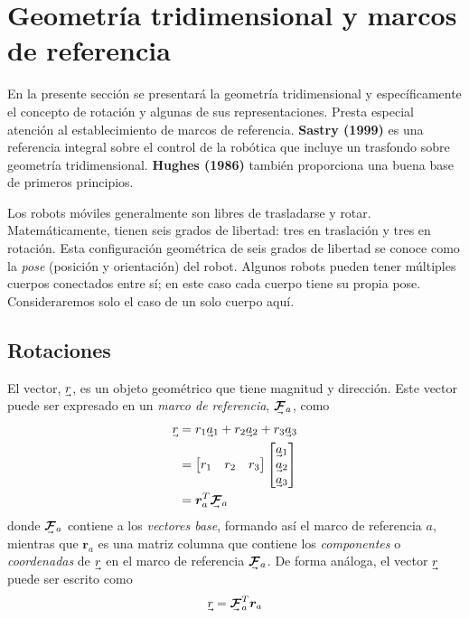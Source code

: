 \section{Geometría tridimensional y marcos de referencia}
En la presente sección se presentará la geometría tridimensional y específicamente el concepto de rotación y algunas de sus representaciones. Presta especial atención al establecimiento de marcos de referencia. \textbf{Sastry (1999)} es una referencia integral sobre el control de la robótica que incluye un trasfondo sobre geometría tridimensional. \textbf{Hughes (1986)} también proporciona una buena base de primeros principios.

Los robots móviles generalmente son libres de trasladarse y rotar. Matemáticamente, tienen seis grados de libertad: tres en traslación y tres en rotación. Esta configuración geométrica de seis grados de libertad se conoce como la \textit{pose} (posición y orientación) del robot. Algunos robots pueden tener múltiples cuerpos conectados entre sí; en este caso cada cuerpo tiene su propia pose. Consideraremos solo el caso de un solo cuerpo aquí.

\subsection{Rotaciones}
El vector, $\undervec{r}$, es un objeto geométrico que tiene magnitud y dirección. Este vector puede ser expresado en un \textit{marco de referencia}, $\undervec{\bm{\mathcal{F}}}_a$, como
\begin{align}
    \undervec{r} &= r_1\undervec{a}_1+ r_2\undervec{a}_2 + r_3\undervec{a}_3 \\
    &= 
    \begin{bmatrix}
    r_1 & r_2 & r_3
    \end{bmatrix}
    \begin{bmatrix}
    \undervec{a}_1 \\ 
    \undervec{a}_2 \\
    \undervec{a}_3
    \end{bmatrix}
    \\
    &= \bm{r}_a^T\undervec{\bm{\mathcal{F}}}_a
\end{align}
donde $\undervec{\bm{\mathcal{F}}}_a$ contiene a los \textit{vectores base}, formando así el marco de referencia $a$, mientras que $\bm{r}_a$ es una matriz columna que contiene los \textit{componentes} o \textit{coordenadas} de $\undervec{r}$ en el marco de referencia $\undervec{\bm{\mathcal{F}}}_a$. De forma análoga, el vector $\undervec{r}$ puede ser escrito como
\begin{equation}
    \undervec{r} = \undervec{\bm{\mathcal{F}}}_a^T \bm{r}_a
\end{equation}

